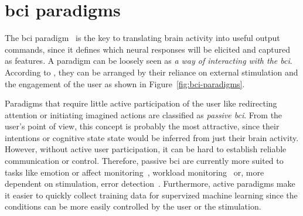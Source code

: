 \section{\ac{bci} paradigms}
\label{sec:bci-paradigms}

The \ac{bci} paradigm~\cite{Xu2021,Neeling2019} is the key to translating brain activity into useful
output commands, since it defines which neural responses will be elicited and
captured as features.
A paradigm can be loosely seen as \emph{a way of interacting with the
\ac{bci}}.
According to \textcite{Zander2011}, they can be arranged by their reliance on
external stimulation and the engagement of the user as shown in
Figure~\ref{fig:bci-paradigms}.


Paradigms that require little active participation of the user like
redirecting attention or initiating imagined actions are classified as \emph{passive
\ac{bci}}.
From the user's point of view, this concept is probably the most attractive,
since their intentions or cognitive state state would be inferred from just
their brain activity.
However, without active user participation, it can be hard to establish reliable
communication or control.
Therefore, passive \ac{bci} are currently more suited to tasks like
emotion or affect monitoring~\cite{Torres2020,Libert2019}, workload
monitoring~\cite{Zanetti2021} or, more dependent on stimulation, error
detection~\cite{SiMohammed2020}.
Furthermore, active paradigms make it easier to quickly collect training data for
supervized machine learning since the conditions can be more easily controlled
by the user or the stimulation.

